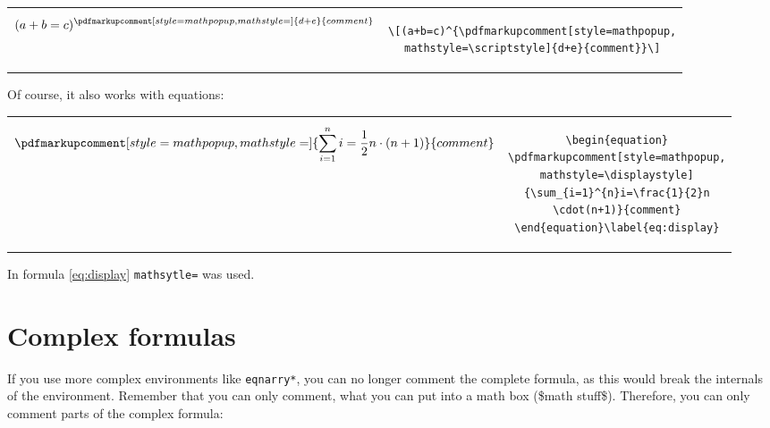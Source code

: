 \documentclass[pagesize,11pt,leqno]{scrartcl}
\begin{document}
\bigskip
\begin{tabular}{cc}
\begin{minipage}{0.25\linewidth}
\[(a+b=c)^{\pdfmarkupcomment[style=mathpopup,mathstyle=\scriptstyle]{d+e}{comment}}\]
\end{minipage} &
\begin{minipage}{0.68\linewidth}
\begin{lstlisting}
\[(a+b=c)^{\pdfmarkupcomment[style=mathpopup,
mathstyle=\scriptstyle]{d+e}{comment}}\]
\end{lstlisting}
\end{minipage}
\end{tabular}

\bigskip
Of course, it also works with equations:

\bigskip
\begin{tabular}{cc}
\begin{minipage}{0.41\linewidth}
\begin{equation}
\pdfmarkupcomment[style=mathpopup,mathstyle=\displaystyle]{\sum_{i=1}^{n}i=\frac{1}{2}n\cdot(n+1)}{comment}
\end{equation}\label{eq:display}
\end{minipage} &
\begin{minipage}{0.52\linewidth}
\begin{lstlisting}
\begin{equation}
\pdfmarkupcomment[style=mathpopup,
mathstyle=\displaystyle]
{\sum_{i=1}^{n}i=\frac{1}{2}n
\cdot(n+1)}{comment}
\end{equation}\label{eq:display}
\end{lstlisting}
\end{minipage}
\end{tabular}

\bigskip
In formula \ref{eq:display} \texttt{mathsytle=\string\displaystyle} was used.

\section{Complex formulas}
If you use more complex environments like \texttt{eqnarry*}, you can no longer comment the complete formula, as this would break the internals of the environment. Remember that you can only comment, what you can put into a math box (\${}math stuff\${}). Therefore, you can only comment parts of the complex formula:
\end{document}
